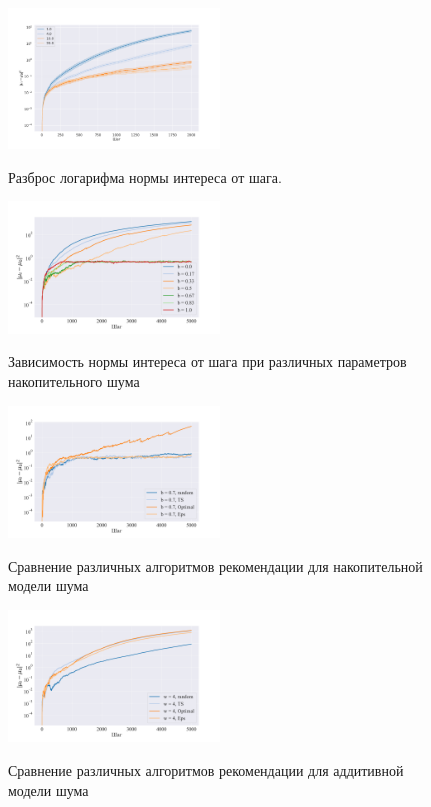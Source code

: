 \documentclass[12pt, twoside]{article}
\begin{document}
\begin{figure}[h]
  \begin{multicols}{2}
    \hfill
    \includegraphics[width=0.5\textwidth]{../figures/var_norm_interest.pdf}
    \hfill
    \caption{Разброс логарифма нормы интереса от шага.}
    \label{fig3}
    \hfill
    \includegraphics[width=0.5\textwidth]{../figures/winstreak_norm_interest.pdf}
    \caption{Зависимость нормы интереса от шага при различных параметров накопительного шума}
    \hfill
    \label{fig4}
  \end{multicols}
\end{figure}

\newpage

\begin{figure}[h]
  \begin{multicols}{2}
    \hfill
    \includegraphics[width=0.5\textwidth]{../figures/compare_model_b.pdf}
    \hfill
    \caption{Сравнение различных алгоритмов рекомендации для накопительной модели шума}
    \label{fig8}
    \hfill
    \includegraphics[width=0.5\textwidth]{../figures/compare_models_w.pdf}
    \hfill
    \caption{Сравнение различных алгоритмов рекомендации для аддитивной модели шума}
    \label{fig9}
  \end{multicols}
\end{figure}
\end{document}
